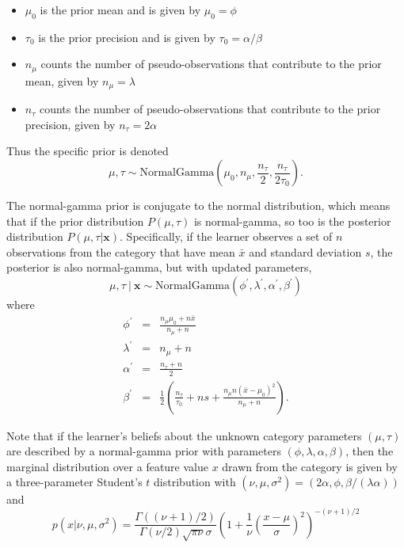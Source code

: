 \documentclass[doc]{apa6}
\newcommand{\given}{\ | \ }
\begin{document}
\begin{itemize} \setlength{\itemsep}{0pt} \setlength{\parskip}{0pt}
\item $\mu_0$ is the prior mean and is given by $\mu_0 = \phi$
\item $\tau_0$ is the prior precision and is given by $\tau_0 = \alpha / \beta$
\item $n_\mu$ counts the number of pseudo-observations that contribute to the prior mean, given by $n_\mu = \lambda$
\item $n_\tau$ counts the number of  pseudo-observations that contribute to the prior precision, given by $n_\tau = 2\alpha$
\end{itemize}



\noindent
Thus the specific prior is denoted
$$
\mu, \tau \sim \mbox{NormalGamma}\left( \mu_0, n_\mu, \frac{n_\tau}{2}, \frac{n_\tau}{2\tau_0} \right).
$$

\noindent
The normal-gamma prior is conjugate to the normal distribution, which means that if the prior distribution $P(\mu,\tau)$ is normal-gamma, so too is the posterior distribution $P(\mu,\tau|\bm{x})$. Specifically, if the learner observes a set of $n$ observations from the category that have mean $\bar{x}$ and standard deviation $s$, the posterior is also normal-gamma, but with
updated parameters,
$$
\mu, \tau \given \bm{x} \sim \mbox{NormalGamma}\left( \phi^\prime, \lambda^\prime, \alpha^\prime, \beta^\prime \right)
$$
where
\begin{eqnarray*}
\phi^\prime &=& \frac{n_\mu \mu_0 + n \bar{x}}{n_\mu + n} \\[3pt]
\lambda^\prime &=& n_\mu + n \\[3pt]
\alpha^\prime &=& \frac{n_\tau + n}{2} \\[3pt]
\beta^\prime &=& \frac{1}{2} \left( \frac{n_\tau}{\tau_0} + ns + \frac{n_\mu n (\bar{x}-\mu_0)^2}{n_\mu + n}\right).
\end{eqnarray*}


\noindent
Note that if the learner's beliefs about the unknown category parameters $(\mu,\tau)$ are described by a normal-gamma prior with parameters $(\phi,\lambda,\alpha,\beta)$, then the marginal distribution over a feature value $x$ drawn from the category is given by a three-parameter Student's $t$ distribution with $(\nu,\mu,\sigma^2) = (2\alpha,\phi,\beta/(\lambda\alpha))$ and
$$
p(x | \nu, \mu, \sigma^2) = \frac{\Gamma((\nu+1)/2)}{\Gamma(\nu/2)\sqrt{\pi\nu}\sigma} \left(1 + \frac{1}{\nu}\left(\frac{x-\mu}{\sigma}\right)^2 \right)^{-(\nu+1)/2}
$$
\end{document}
